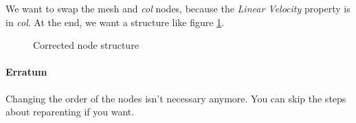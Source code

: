 \documentclass[10pt,a4paper]{article}
\begin{document}
We want to swap the mesh and \textit{col} nodes, because the \textit{Linear Velocity} property is in \textit{col}. At the end, we want a structure like figure \ref{fig:corrected_col_node_structure}.
\begin{figure}[H]
\centering
{}
\caption{Corrected node structure}
\label{fig:corrected_col_node_structure}
\end{figure}

\paragraph{Erratum}
Changing the order of the nodes isn't necessary anymore. You can skip the steps about reparenting if you want. 
\end{document}

